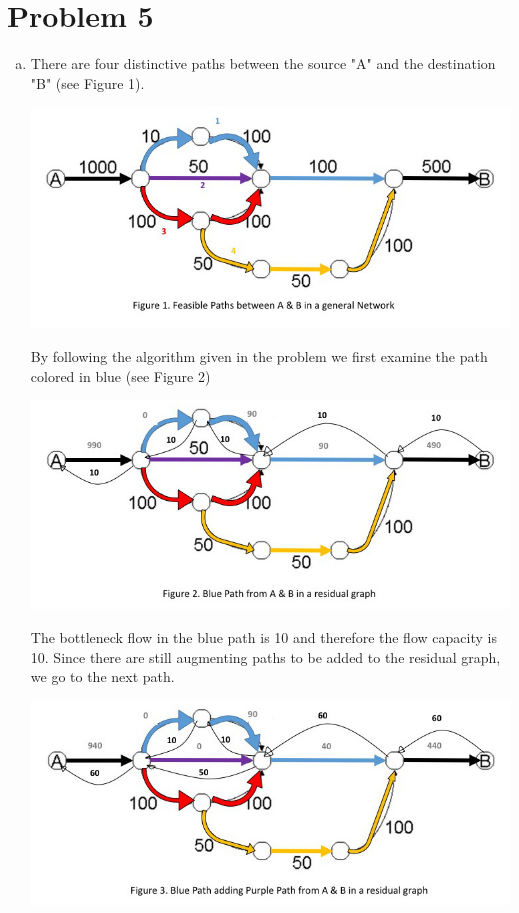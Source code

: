 \documentclass{article}   	                         %
\begin{document}
\section*{Problem 5}
\begin{enumerate}[(a)]
\item
There are four distinctive paths between the source "A" and the destination "B" (see Figure 1). 
\begin{center}
\includegraphics[scale = 0.45]{slide1.jpg}
\end{center}
By following the algorithm given in the problem we first examine the path colored in blue (see Figure 2) 
\begin{center}
\includegraphics[scale = 0.45]{slide2.jpg}
\end{center}
The bottleneck flow in the blue path is 10 and therefore the flow capacity is 10. Since there are still augmenting paths to be added to the residual graph, we go to the next path.
\begin{center}
\includegraphics[scale = 0.45]{slide3.jpg}

\end{center}
\end{enumerate}
\end{document}
